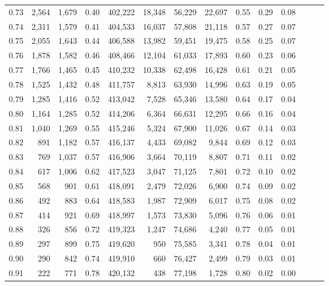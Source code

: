 \begin{tabular}{rrrrrrrrrrrrrr}
0.73 &  2,564 &  1,679 &  0.40 &  402,222 &   18,348 &  56,229 &  22,697 &  0.55 &  0.29 &      0.08 \\
0.74 &  2,311 &  1,579 &  0.41 &  404,533 &   16,037 &  57,808 &  21,118 &  0.57 &  0.27 &      0.07 \\
0.75 &  2,055 &  1,643 &  0.44 &  406,588 &   13,982 &  59,451 &  19,475 &  0.58 &  0.25 &      0.07 \\
0.76 &  1,878 &  1,582 &  0.46 &  408,466 &   12,104 &  61,033 &  17,893 &  0.60 &  0.23 &      0.06 \\
0.77 &  1,766 &  1,465 &  0.45 &  410,232 &   10,338 &  62,498 &  16,428 &  0.61 &  0.21 &      0.05 \\
0.78 &  1,525 &  1,432 &  0.48 &  411,757 &    8,813 &  63,930 &  14,996 &  0.63 &  0.19 &      0.05 \\
0.79 &  1,285 &  1,416 &  0.52 &  413,042 &    7,528 &  65,346 &  13,580 &  0.64 &  0.17 &      0.04 \\
0.80 &  1,164 &  1,285 &  0.52 &  414,206 &    6,364 &  66,631 &  12,295 &  0.66 &  0.16 &      0.04 \\
0.81 &  1,040 &  1,269 &  0.55 &  415,246 &    5,324 &  67,900 &  11,026 &  0.67 &  0.14 &      0.03 \\
0.82 &    891 &  1,182 &  0.57 &  416,137 &    4,433 &  69,082 &   9,844 &  0.69 &  0.12 &      0.03 \\
0.83 &    769 &  1,037 &  0.57 &  416,906 &    3,664 &  70,119 &   8,807 &  0.71 &  0.11 &      0.02 \\
0.84 &    617 &  1,006 &  0.62 &  417,523 &    3,047 &  71,125 &   7,801 &  0.72 &  0.10 &      0.02 \\
0.85 &    568 &    901 &  0.61 &  418,091 &    2,479 &  72,026 &   6,900 &  0.74 &  0.09 &      0.02 \\
0.86 &    492 &    883 &  0.64 &  418,583 &    1,987 &  72,909 &   6,017 &  0.75 &  0.08 &      0.02 \\
0.87 &    414 &    921 &  0.69 &  418,997 &    1,573 &  73,830 &   5,096 &  0.76 &  0.06 &      0.01 \\
0.88 &    326 &    856 &  0.72 &  419,323 &    1,247 &  74,686 &   4,240 &  0.77 &  0.05 &      0.01 \\
0.89 &    297 &    899 &  0.75 &  419,620 &      950 &  75,585 &   3,341 &  0.78 &  0.04 &      0.01 \\
0.90 &    290 &    842 &  0.74 &  419,910 &      660 &  76,427 &   2,499 &  0.79 &  0.03 &      0.01 \\
0.91 &    222 &    771 &  0.78 &  420,132 &      438 &  77,198 &   1,728 &  0.80 &  0.02 &      0.00 \\

\end{tabular}
